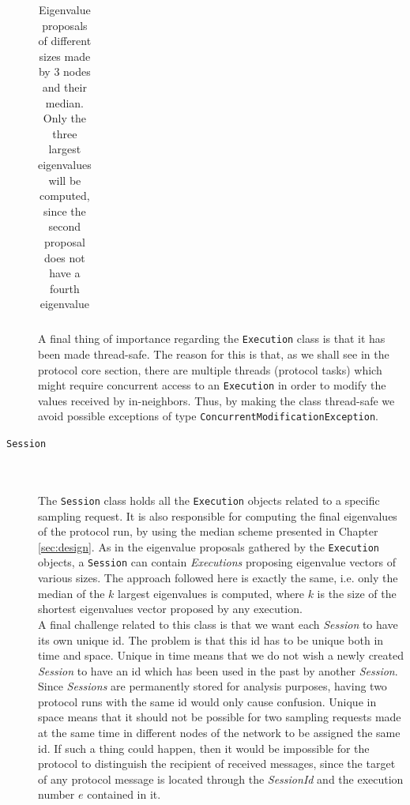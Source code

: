 \documentclass[a4paper,11pt,twoside]{report}
\newcommand{\classname}[1]{\texttt{#1}}
\begin{document}
\begin{description}
\begin{table}[H]
\begin{tabular}{c|c|c|c|c|}
\end{tabular}
\caption{Eigenvalue proposals of different sizes made by 3 nodes and their median. Only the three largest eigenvalues will be computed, since the second proposal does not have a fourth eigenvalue }
\label{table:largest_eigenvalues}
\end{table}


A final thing of importance regarding the \classname{Execution} class is that it has been made thread-safe. The reason for this is that, as we shall see in the protocol core section, there are multiple threads (protocol tasks) which might require concurrent access to an \classname{Execution} in order to modify the values received by in-neighbors. Thus, by making the class thread-safe we avoid possible exceptions of type \classname{ConcurrentModificationException}.
\item[\classname{Session}] \hfill \\\\
The \classname{Session} class holds all the \classname{Execution} objects related to a specific sampling request. It is also responsible for computing the final eigenvalues of the protocol run, by using the median scheme presented in Chapter \ref{sec:design}. As in the eigenvalue proposals gathered by the \classname{Execution} objects, a \classname{Session} can contain \textit{Executions} proposing eigenvalue vectors of various sizes. The approach followed here is exactly the same, i.e. only the median of the $k$ largest eigenvalues is computed, where $k$ is the size of the shortest eigenvalues vector proposed by any execution. \\

A final challenge related to this class is that we want each \textit{Session} to have its own unique id. The problem is that this id has to be unique both in time and space. Unique in time means that we do not wish a newly created \textit{Session} to have an id which has been used in the past by another \textit{Session}. Since \textit{Sessions} are permanently stored for analysis purposes, having two protocol runs with the same id would only cause confusion. Unique in space means that it should not be possible for two sampling requests made at the same time in different nodes of the network to be assigned the same id. If such a thing could happen, then it would be impossible for the protocol to distinguish the recipient of received messages, since the target of any protocol message is located through the \textit{SessionId} and the execution number $e$ contained in it.\\


\end{description}
\end{document}
